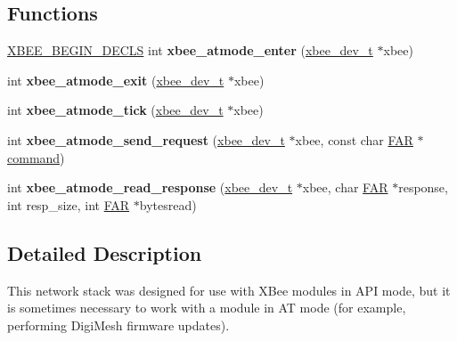 \subsection*{Functions}
\begin{DoxyCompactItemize}
\item 
\hypertarget{group__xbee__atmode_ga3955ec8593c4a78108e20050f03a071d}{\hyperlink{group__hal_ga336bff4f4a6012aacc4468132bbd3d7f}{X\-B\-E\-E\-\_\-\-B\-E\-G\-I\-N\-\_\-\-D\-E\-C\-L\-S} int {\bfseries xbee\-\_\-atmode\-\_\-enter} (\hyperlink{structxbee__dev__t}{xbee\-\_\-dev\-\_\-t} $\ast$xbee)}\label{group__xbee__atmode_ga3955ec8593c4a78108e20050f03a071d}

\item 
\hypertarget{group__xbee__atmode_ga3588aa398a61e724b20112486d9437be}{int {\bfseries xbee\-\_\-atmode\-\_\-exit} (\hyperlink{structxbee__dev__t}{xbee\-\_\-dev\-\_\-t} $\ast$xbee)}\label{group__xbee__atmode_ga3588aa398a61e724b20112486d9437be}

\item 
\hypertarget{group__xbee__atmode_ga3c075890a2c8cdbd94d47ed0418f10c7}{int {\bfseries xbee\-\_\-atmode\-\_\-tick} (\hyperlink{structxbee__dev__t}{xbee\-\_\-dev\-\_\-t} $\ast$xbee)}\label{group__xbee__atmode_ga3c075890a2c8cdbd94d47ed0418f10c7}

\item 
\hypertarget{group__xbee__atmode_gac814f6775234b54771cf51acd381c1a7}{int {\bfseries xbee\-\_\-atmode\-\_\-send\-\_\-request} (\hyperlink{structxbee__dev__t}{xbee\-\_\-dev\-\_\-t} $\ast$xbee, const char \hyperlink{group__hal_gaef060b3456fdcc093a7210a762d5f2ed}{F\-A\-R} $\ast$\hyperlink{group__xbee__atcmd_ga1a5aaa930940857f68f245eeb89506b5}{command})}\label{group__xbee__atmode_gac814f6775234b54771cf51acd381c1a7}

\item 
\hypertarget{group__xbee__atmode_gaba5dc9011c35a28b078fab86e99d24da}{int {\bfseries xbee\-\_\-atmode\-\_\-read\-\_\-response} (\hyperlink{structxbee__dev__t}{xbee\-\_\-dev\-\_\-t} $\ast$xbee, char \hyperlink{group__hal_gaef060b3456fdcc093a7210a762d5f2ed}{F\-A\-R} $\ast$response, int resp\-\_\-size, int \hyperlink{group__hal_gaef060b3456fdcc093a7210a762d5f2ed}{F\-A\-R} $\ast$bytesread)}\label{group__xbee__atmode_gaba5dc9011c35a28b078fab86e99d24da}

\end{DoxyCompactItemize}


\subsection{Detailed Description}
This network stack was designed for use with X\-Bee modules in A\-P\-I mode, but it is sometimes necessary to work with a module in A\-T mode (for example, performing Digi\-Mesh firmware updates). 